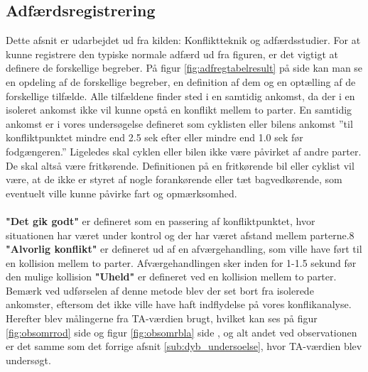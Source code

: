 \subsection{Adfærdsregistrering}
\label{sub:adfregis}
Dette afsnit er udarbejdet ud fra kilden: Konfliktteknik og adfærdsstudier.
For	at kunne registrere den typiske normale adfærd ud	 fra figuren, er det vigtigt at definere	de	forskellige	begreber. På figur \cref{fig:adfregtabelresult} på side \pageref{fig:adfregtabelresult} kan man se en	opdeling af de forskellige begreber, en definition af dem og en optælling af de forskellige tilfælde. Alle	tilfældene finder sted i	en samtidig ankomst, da der i en isoleret ankomst	 ikke vil kunne	opstå en konflikt mellem to parter. En samtidig ankomst er i vores undersøgelse defineret som cyklisten eller bilens ankomst ”til konfliktpunktet mindre end 2.5 sek efter eller mindre end 1.0 sek før fodgængeren.” \autocite{adf}	Ligeledes skal cyklen	eller bilen ikke være påvirket af andre parter. De skal altså være fritkørende. Definitionen på en fritkørende bil eller cyklist	vil	være, at de ikke er styret af nogle	forankørende eller tæt bagvedkørende, som eventuelt ville kunne påvirke fart og opmærksomhed.
\\\\
\textbf{"Det	gik	godt"} er defineret som en passering af konfliktpunktet, hvor situationen
har	været under kontrol og der har været afstand mellem parterne.8
\textbf{"Alvorlig konflikt"}	er defineret ud af en afværgehandling, som ville have ført til en kollision mellem to parter. Afværgehandlingen sker inden for 1-1.5 sekund før den mulige	kollision%
\textbf{"Uheld"} er defineret ved en kollision mellem to parter.
Bemærk ved udførselen af denne metode blev der set bort fra isolerede ankomster, eftersom det ikke ville have haft indflydelse på vores konflikanalyse. Herefter blev målingerne fra TA-værdien brugt, hvilket kan ses på figur \cref{fig:obsomrrod} side \pageref{fig:obsomrrod} og figur \cref{fig:obsomrbla} side \pageref{fig:obsomrbla}, og alt andet ved observationen er det samme som det forrige afsnit \cref{sub:dyb_undersoelse}, hvor TA-værdien blev undersøgt.
